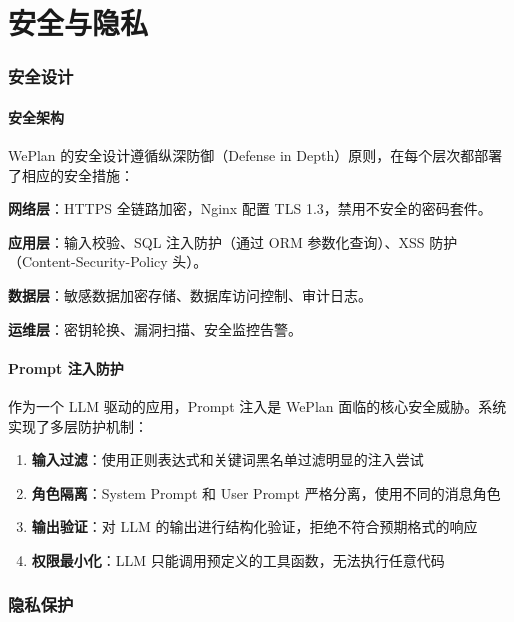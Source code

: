 \documentclass[12pt,a4paper]{ctexart}
\begin{document}
\newpage


\part{安全与隐私}

\section{安全设计}

\subsection{安全架构}

WePlan 的安全设计遵循纵深防御（Defense in Depth）原则，在每个层次都部署了相应的安全措施：

\textbf{网络层}：HTTPS 全链路加密，Nginx 配置 TLS 1.3，禁用不安全的密码套件。

\textbf{应用层}：输入校验、SQL 注入防护（通过 ORM 参数化查询）、XSS 防护（Content-Security-Policy 头）。

\textbf{数据层}：敏感数据加密存储、数据库访问控制、审计日志。

\textbf{运维层}：密钥轮换、漏洞扫描、安全监控告警。

\subsection{Prompt 注入防护}

作为一个 LLM 驱动的应用，Prompt 注入是 WePlan 面临的核心安全威胁。系统实现了多层防护机制：

\begin{enumerate}[leftmargin=2em]
  \item \textbf{输入过滤}：使用正则表达式和关键词黑名单过滤明显的注入尝试
  \item \textbf{角色隔离}：System Prompt 和 User Prompt 严格分离，使用不同的消息角色
  \item \textbf{输出验证}：对 LLM 的输出进行结构化验证，拒绝不符合预期格式的响应
  \item \textbf{权限最小化}：LLM 只能调用预定义的工具函数，无法执行任意代码
\end{enumerate}

\section{隐私保护}
\end{document}
